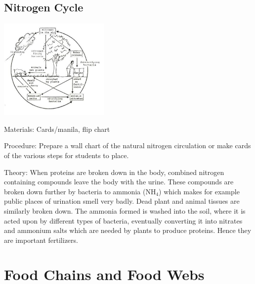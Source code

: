 \begin{multicols}{2}
\subsection{Nitrogen Cycle}

\begin{center}
\includegraphics[width=0.4\textwidth]{./img/source/nitrogen-cycle.jpg}
\end{center}

\begin{description*}
\item[Materials:]{Cards/manila, flip chart}
\item[Procedure:]{Prepare a wall chart of the natural nitrogen
circulation or make cards of the various steps for students to place. }
\item[Theory:]{When proteins are broken down in
the body, combined nitrogen containing
compounds leave the body with the urine. These
compounds are broken down further by bacteria
to ammonia (NH$_4$) which makes for example
public places of urination smell very badly.
Dead plant and animal tissues are similarly
broken down. The ammonia formed is washed
into the soil, where it is acted upon by different
types of bacteria, eventually converting it into
nitrates and ammonium salts which are needed
by plants to produce proteins. Hence they are
important fertilizers.}
\end{description*}


\section*{Food Chains and Food Webs}



\end{multicols}

